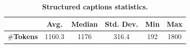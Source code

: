 \begin{table}[t]
\centering
{\setlength{\tabcolsep}{4pt} %
\begin{tabular}{cccccc}
\toprule
& \textbf{Avg.} & \textbf{Median} & \textbf{Std. Dev.} & \textbf{Min} & \textbf{Max} \\
\midrule
$\#$\textbf{Tokens} & 1160.3 & 1176 & 316.4 & 192 & 1800 \\
\bottomrule
\end{tabular}
}
\caption{\textbf{Structured captions statistics.}}
\label{tab:caption_stats}
\end{table}
